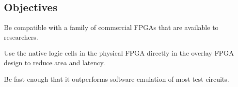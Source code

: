 \subsection{Objectives}

\begin{itemlist}
	\item Be compatible with a family of commercial FPGAs that are available to researchers.
	\item Use the native logic cells in the physical FPGA directly in the overlay FPGA design to reduce area and latency.
	\item Be fast enough that it outperforms software emulation of most test circuits.
\end{itemlist}

